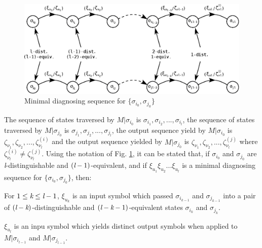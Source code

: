 \begin{figure}
    \centering
    \includegraphics[width=330pt,clip]{images/eps/minimalDiagnosingSequence}
    \caption{Minimal diagnosing sequence for $\{ \sigma_{i_{0}}, \sigma_{j_{0}} \}$ }
    \label{fig:minimalDiagSequence}
\end{figure}

The sequence of states traversed by $ M|\sigma_{i_{0}}$ is $\sigma_{i_{1}}, \sigma_{i_{2}}, ..., \sigma_{i_{l}} $, the sequence of states traversed by $ M|\sigma_{j_{0}} $ is $\sigma_{j_{1}}, \sigma_{j_{2}}, ..., \sigma_{j_{l}} $, the output sequence yield by $ M|\sigma_{i_{0}}$ is $\zeta_{\nu_{1}}, \zeta_{\nu_{2}}, ..., \zeta^{(i)}_{\nu_{l}} $ and the output sequence yielded by $ M|\sigma_{j_{0}} $ is $\zeta_{\nu_{1}}, \zeta_{\nu_{2}}, ..., \zeta^{(j)}_{\nu_{l}} $ where $ \zeta^{(i)}_{\nu_{l}} \neq \zeta^{(j)}_{\nu_{l}} $. Using the notation of Fig. \ref{fig:minimalDiagSequence}, it can be stated that, if $\sigma_{i_{0}}$ and $\sigma_{j_{0}}$ are \emph{l}-distinguishable and $(\emph{l}-1)$-equivalent, and if $\xi_{u_{1}}\xi_{u_{2}}...\xi_{u_{l}}$ is a minimal diagnosing sequence for $\{  \sigma_{i_{0}}, \sigma_{j_{0}}\}$, then: \begin{inparaenum}[(1) ]
    \item For $ 1 \leq \emph{k} \leq \emph{l} - 1$, $\xi_{u_{k}}$ is an input symbol which passed $\sigma_{i_{k-1}}$ and $\sigma_{j_{k-1}}$ into a pair of $(\emph{l} - \emph{k})$-distinguishable and $(\emph{l} - \emph{k} - 1)$-equivalent states $\sigma_{i_{k}}$ and $\sigma_{j_{k}}$.
    \item $\xi_{u_{l}}$ is an inpu symbol which yields distinct output symbols when applied to $ M|\sigma_{i_{l-1}}$ and $ M|\sigma_{j_{l-1}}$.
\end{inparaenum}

